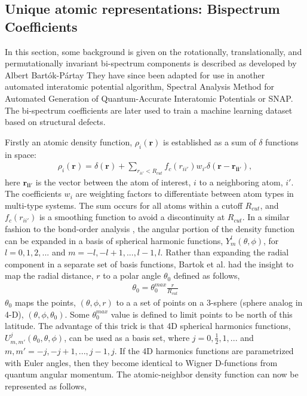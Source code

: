 \documentclass[12pt]{iopart}
\begin{document}
\subsection{Unique atomic representations: Bispectrum Coefficients}

In this section, some background is given on the rotationally, translationally, and permutationally invariant bi-spectrum components is described as developed by Albert Bartók-Pártay \cite{Bartok-Partay} They have since been adapted for use in another automated interatomic potential algorithm, Spectral Analysis Method for Automated Generation of Quantum-Accurate Interatomic Potentials or SNAP. \cite{Thompson2014} The bi-spectrum coefficients are later used to train a machine learning dataset based on structural defects.

Firstly an atomic density function, $\rho_i(\mathbf{r})$ is established as a sum of $\delta$ functions in space:
\begin{eqnarray}
\rho_i(\mathbf{r}) = \delta(\mathbf{r}) + \sum_{r_{ii'} < R_{cut}} f_c(r_{ii'})w_{i'}\delta(\mathbf{r}-\mathbf{r_{ii'}}),
\end{eqnarray}
here $\mathbf{r_{ii'}}$ is the vector between the atom of interest, $i$ to a neighboring atom, $i'$. The coefficients $w_i$ are weighting factors to differentiate between atom types in multi-type systems. The sum occurs for all atoms within a cutoff $R_{cut}$, and $f_c(r_{ii'})$ is a smoothing function to avoid a discontinuity at $R_{cut}$. In a similar fashion to the bond-order analysis \cite{Steinhardt1983}, the angular portion of the density function can be expanded in a basis of spherical harmonic functions, $Y_m^l(\theta,\phi)$, for $l = 0, 1, 2, ...$ and $m =-l , -l +1, ..., l-1, l$. \cite{varshalovich1988} Rather than expanding the radial component in a separate set of basis functions, Bartok et al. \cite{Bartok2010a} had the insight to map the radial distance, $r$ to a polar angle $\theta_0$ defined as follows,
\begin{eqnarray}
\theta_0 = \theta_0^{max} \frac{r}{R_{cut}}
\end{eqnarray}
$\theta_0$ maps the points, $(\theta,\phi,r)$ to a a set of points on a 3-sphere (sphere analog in 4-D), $(\theta,\phi,\theta_0)$. Some $\theta_0^{max}$ value is defined to limit points to be north of this latitude. The advantage of this trick is that 4D spherical harmonics functions, $U_{m,m'}^j(\theta_0,\theta,\phi)$, can be used as a basis set, where $j=0,\frac{1}{2},1,...$ and $m,m' = -j, -j+1, ..., j-1, j$. If the 4D harmonics functions are parametrized with Euler angles, then they become identical to Wigner D-functions from quantum angular momentum. The atomic-neighbor density function can now be represented as follows,
\end{document}
